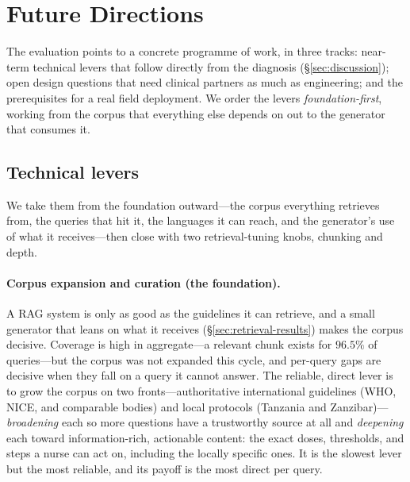 \section{Future Directions}
\label{sec:future}

The evaluation points to a concrete programme of work, in three tracks:
near-term technical levers that follow directly from the diagnosis
(\S\ref{sec:discussion}); open design questions that need clinical partners as
much as engineering; and the prerequisites for a real field deployment. We order
the levers \emph{foundation-first}, working from the corpus that everything else
depends on out to the generator that consumes it.

\subsection{Technical levers}

We take them from the foundation outward---the corpus everything retrieves from,
the queries that hit it, the languages it can reach, and the generator's use of
what it receives---then close with two retrieval-tuning knobs, chunking and
depth.

\paragraph{Corpus expansion and curation (the foundation).} A RAG system is only
as good as the guidelines it can retrieve, and a small generator that leans on
what it receives (\S\ref{sec:retrieval-results}) makes the corpus decisive.
Coverage is high in aggregate---a relevant chunk exists for $96.5\%$ of
queries---but the corpus was not expanded this cycle, and per-query gaps are
decisive when they fall on a query it cannot answer. The reliable, direct lever
is to grow the corpus on two fronts---authoritative international guidelines
(WHO, NICE, and comparable bodies) and local protocols (Tanzania and
Zanzibar)---\emph{broadening} each so more questions have a trustworthy source at
all and \emph{deepening} each toward information-rich, actionable content: the
exact doses, thresholds, and steps a nurse can act on, including the locally
specific ones. It is the slowest lever but the most reliable, and its payoff is the
most direct per query.

